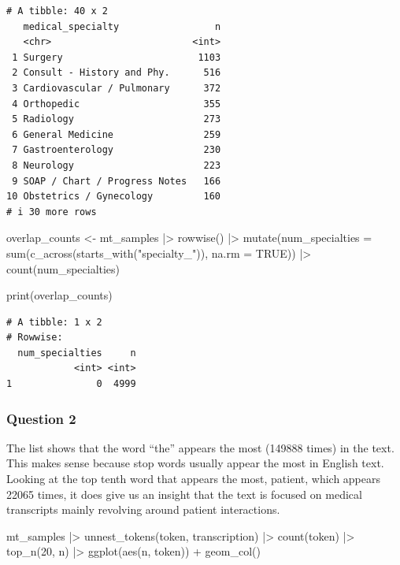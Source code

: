 \documentclass[
  letterpaper,
  DIV=11,
  numbers=noendperiod]{scrartcl}
\newenvironment{Shaded}{\begin{snugshade}}{\end{snugshade}}
\newcommand{\AttributeTok}[1]{\textcolor[rgb]{0.40,0.45,0.13}{#1}}
\newcommand{\ConstantTok}[1]{\textcolor[rgb]{0.56,0.35,0.01}{#1}}
\newcommand{\DecValTok}[1]{\textcolor[rgb]{0.68,0.00,0.00}{#1}}
\newcommand{\FunctionTok}[1]{\textcolor[rgb]{0.28,0.35,0.67}{#1}}
\newcommand{\NormalTok}[1]{\textcolor[rgb]{0.00,0.23,0.31}{#1}}
\newcommand{\OtherTok}[1]{\textcolor[rgb]{0.00,0.23,0.31}{#1}}
\newcommand{\SpecialCharTok}[1]{\textcolor[rgb]{0.37,0.37,0.37}{#1}}
\newcommand{\StringTok}[1]{\textcolor[rgb]{0.13,0.47,0.30}{#1}}
\begin{document}
\begin{verbatim}
# A tibble: 40 x 2
   medical_specialty                 n
   <chr>                         <int>
 1 Surgery                        1103
 2 Consult - History and Phy.      516
 3 Cardiovascular / Pulmonary      372
 4 Orthopedic                      355
 5 Radiology                       273
 6 General Medicine                259
 7 Gastroenterology                230
 8 Neurology                       223
 9 SOAP / Chart / Progress Notes   166
10 Obstetrics / Gynecology         160
# i 30 more rows
\end{verbatim}

\begin{Shaded}
\begin{Highlighting}[]
\NormalTok{overlap\_counts }\OtherTok{\textless{}{-}}\NormalTok{ mt\_samples }\SpecialCharTok{|\textgreater{}}
\FunctionTok{rowwise}\NormalTok{() }\SpecialCharTok{|\textgreater{}}
\FunctionTok{mutate}\NormalTok{(}\AttributeTok{num\_specialties =} \FunctionTok{sum}\NormalTok{(}\FunctionTok{c\_across}\NormalTok{(}\FunctionTok{starts\_with}\NormalTok{(}\StringTok{"specialty\_"}\NormalTok{)), }\AttributeTok{na.rm =} \ConstantTok{TRUE}\NormalTok{)) }\SpecialCharTok{|\textgreater{}}
\FunctionTok{count}\NormalTok{(num\_specialties)}

\FunctionTok{print}\NormalTok{(overlap\_counts)}
\end{Highlighting}
\end{Shaded}

\begin{verbatim}
# A tibble: 1 x 2
# Rowwise: 
  num_specialties     n
            <int> <int>
1               0  4999
\end{verbatim}

\subsubsection{Question 2}\label{question-2}

The list shows that the word ``the'' appears the most (149888 times) in
the text. This makes sense because stop words usually appear the most in
English text. Looking at the top tenth word that appears the most,
patient, which appears 22065 times, it does give us an insight that the
text is focused on medical transcripts mainly revolving around patient
interactions.

\begin{Shaded}
\begin{Highlighting}[]
\NormalTok{mt\_samples }\SpecialCharTok{|\textgreater{}} 
  \FunctionTok{unnest\_tokens}\NormalTok{(token, transcription) }\SpecialCharTok{|\textgreater{}} 
  \FunctionTok{count}\NormalTok{(token) }\SpecialCharTok{|\textgreater{}} 
  \FunctionTok{top\_n}\NormalTok{(}\DecValTok{20}\NormalTok{, n) }\SpecialCharTok{|\textgreater{}} 
  \FunctionTok{ggplot}\NormalTok{(}\FunctionTok{aes}\NormalTok{(n, token)) }\SpecialCharTok{+}
  \FunctionTok{geom\_col}\NormalTok{()}
\end{Highlighting}
\end{Shaded}
\end{document}
